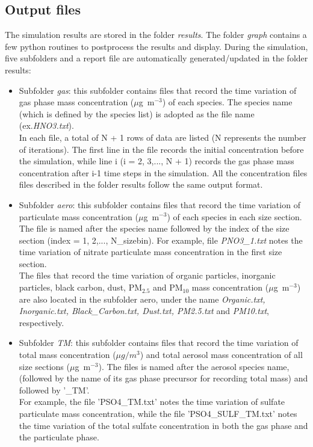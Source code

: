 \documentclass[a4paper,11pt]{article}
\begin{document}
\subsection{Output files}
The simulation results are stored in the folder {\it{results}}. The folder {\it{graph}} contains a few python routines to postprocess the results and display.
During the simulation, five subfolders and a report file are automatically generated/updated in the folder results:

\begin{itemize}
	\item Subfolder {\it{gas}}: this subfolder contains files that record the time variation of gas phase mass concentration ($\mu$g~m$^{-3}$) of each species.
	 The species name (which is defined by the species list) is adopted as the file name (ex.\textit{HNO3.txt}).\\ 
	 In each file, a total of N + 1 rows of data are listed (N represents the number of iterations). The first line in the file records the initial concentration before the simulation, while line i (i = 2, 3,..., N + 1) records the gas phase mass concentration after i-1 time steps in the simulation. All the concentration files files described in the folder results follow the same output format.
	 
	\item Subfolder {\it{aero}}: this subfolder contains files that record the time variation of particulate mass concentration ($\mu$g~m$^{-3}$) of each species in each size section. The file is named after the species name followed by the index of the size section (index = 1, 2,..., N\_sizebin). For example, file \textit{PNO3\_1.txt} notes the time variation of nitrate particulate mass concentration in the first size section.\\ 
	The files that record the time variation of organic particles, inorganic particles, black carbon, dust, PM$_{2.5}$ and PM$_{10}$ mass concentration ($\mu$g~m$^{-3}$) are also located in the subfolder aero, under the name \textit{Organic.txt, Inorganic.txt, Black\_Carbon.txt, Dust.txt, PM2.5.txt} and \textit{PM10.txt}, respectively.

	\item Subfolder {\it{TM}}: this subfolder contains files that record the time variation of total mass concentration ($\mu g/m^3$) and total aerosol mass concentration of all size sections ($\mu$g~m$^{-3}$). The files is named after the aerosol species name, (followed by the name of its gas phase precursor for recording total mass) and followed by '\_TM'.\\ 
	For example, the file 'PSO4\_TM.txt' notes the time variation of sulfate particulate mass concentration, while the file 'PSO4\_SULF\_TM.txt' notes the time variation of the total sulfate concentration in both the gas phase and the particulate phase.
	

\end{itemize}
\end{document}
